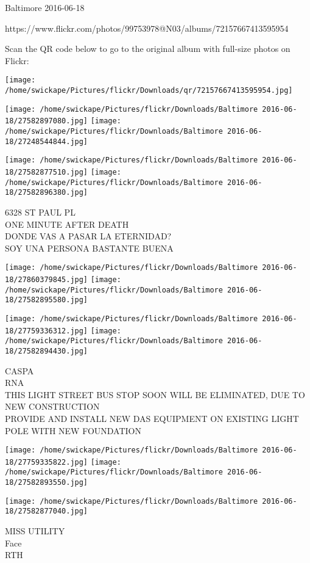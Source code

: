 \documentclass[10pt,letterpaper]{article}
\begin{document}
Baltimore 2016-06-18

https://www.flickr.com/photos/99753978@N03/albums/72157667413595954

Scan the QR code below to go to the original album with full-size photos on Flickr:

\texttt{[image: /home/swickape/Pictures/flickr/Downloads/qr/72157667413595954.jpg]}
\pagebreak

\texttt{[image: /home/swickape/Pictures/flickr/Downloads/Baltimore 2016-06-18/27582897080.jpg]}
\texttt{[image: /home/swickape/Pictures/flickr/Downloads/Baltimore 2016-06-18/27248544844.jpg]}

\texttt{[image: /home/swickape/Pictures/flickr/Downloads/Baltimore 2016-06-18/27582877510.jpg]}
\texttt{[image: /home/swickape/Pictures/flickr/Downloads/Baltimore 2016-06-18/27582896380.jpg]}

6328 ST PAUL PL\\
ONE MINUTE AFTER DEATH\\
DONDE VAS A PASAR LA ETERNIDAD?\\
SOY UNA PERSONA BASTANTE BUENA
\pagebreak

\texttt{[image: /home/swickape/Pictures/flickr/Downloads/Baltimore 2016-06-18/27860379845.jpg]}
\texttt{[image: /home/swickape/Pictures/flickr/Downloads/Baltimore 2016-06-18/27582895580.jpg]}

\texttt{[image: /home/swickape/Pictures/flickr/Downloads/Baltimore 2016-06-18/27759336312.jpg]}
\texttt{[image: /home/swickape/Pictures/flickr/Downloads/Baltimore 2016-06-18/27582894430.jpg]}

CASPA\\
RNA\\
THIS LIGHT STREET BUS STOP SOON WILL BE ELIMINATED, DUE TO NEW CONSTRUCTION\\
PROVIDE AND INSTALL NEW DAS EQUIPMENT ON EXISTING LIGHT POLE WITH NEW FOUNDATION
\pagebreak

\texttt{[image: /home/swickape/Pictures/flickr/Downloads/Baltimore 2016-06-18/27759335822.jpg]}
\texttt{[image: /home/swickape/Pictures/flickr/Downloads/Baltimore 2016-06-18/27582893550.jpg]}

\texttt{[image: /home/swickape/Pictures/flickr/Downloads/Baltimore 2016-06-18/27582877040.jpg]}

MISS UTILITY\\
Face\\
RTH
\pagebreak
\end{document}
